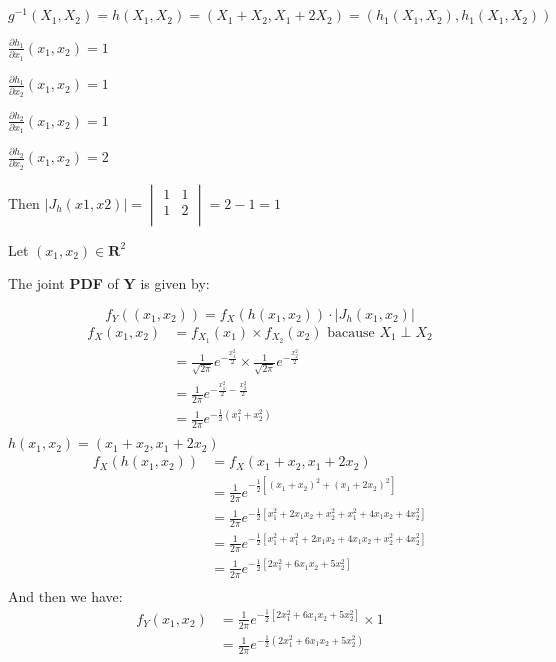 \documentclass[11pt]{article}
\begin{document}
$g^{-1}(X_1,X_2)=h(X_1,X_2)=(X_1+X_2,X_1+2X_2 )=(h_1(X_1,X_2),h_1(X_1,X_2))$

$\frac{\partial h_1}{\partial x_1}(x_1,x_2)=1 $
 
$\frac{\partial h_1}{\partial x_2}(x_1,x_2)=1 $ 
 
$\frac{\partial h_2}{\partial x_1}(x_1,x_2)=1 $ 
 
$\frac{\partial h_2}{\partial x_2}(x_1,x_2)=2 $

Then $|J_h(x1,x2)|=\begin{vmatrix}
1 & 1 \\
1 & 2 \\
\end{vmatrix}=2-1=1$

Let $(x_1,x_2) \in \mathbf{R}^2  $

The joint \textbf{PDF} of $\mathbf{Y}$ is given by:

\[
f_Y((x_1,x_2)) = f_X(h(x_1,x_2)) \cdot |J_h(x_1,x_2)|
\]
\begin{align*}
f_X(x_1,x_2)
&=f_{X_1}(x_1)\times f_{X_2}(x_2) \text{ bacause  } X_1\perp X_2\\
&=\frac{1}{\sqrt{2\pi}} e^{-\frac{x_1^2}{2}}\times \frac{1}{\sqrt{2\pi}} e^{-\frac{x_2^2}{2}}\\
&=\frac{1}{2\pi} e^{-\frac{x_1^2}{2} -\frac{x_2^2}{2}}\\
&=\frac{1}{2\pi} e^{-\frac{1}{2}(x_1^2+x_2^2)}\\
\end{align*}
$h(x_1,x_2)=(x_1+x_2,x_1+2x_2 )$
\begin{align*}
f_X(h(x_1,x_2))
&=f_X(x_1+x_2,x_1+2x_2 )\\
&=\frac{1}{2\pi} e^{-\frac{1}{2}[(x_1+x_2)^2+(x_1+2x_2)^2]}\\
&=\frac{1}{2\pi} e^{-\frac{1}{2}[x_1^2+ 2x_1 x_2+x_2^2+x_1^2+ 4x_1 x_2+4x_2^2]}\\
&=\frac{1}{2\pi} e^{-\frac{1}{2}[x_1^2+ x_1^2+ 2x_1 x_2+4 x_1 x_2 +x_2^2+ 4x_2^2]}\\
&=\frac{1}{2\pi} e^{-\frac{1}{2}[2x_1^2+ 6x_1 x_2+ 5x_2^2]}\\
\end{align*}
And then we have:
\begin{align*}
f_Y(x_1,x_2)
&=\frac{1}{2\pi} e^{-\frac{1}{2}[2x_1^2+ 6x_1 x_2+ 5x_2^2]} \times 1\\
&=\frac{1}{2\pi} e^{-\frac{1}{2}(2x_1^2+ 6x_1 x_2+ 5x_2^2)} \\
\end{align*}
\end{document}
